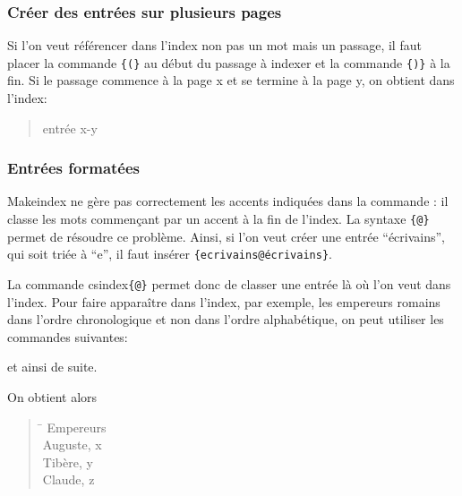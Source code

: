 \begin{bashcode}
  

\subsubsection{Créer des entrées sur plusieurs pages}

Si l'on veut référencer dans l'index non pas un mot mais un passage, il faut placer la commande \verb|{|\verb|(}| au début du passage à indexer et la commande  \verb|{|\verb|)}| à la fin. Si le passage commence à la page x et se termine à la page y, on obtient dans l'index: 

\begin{quotation}
entrée x-y
\end{quotation}


\subsubsection{Entrées formatées}

Makeindex ne gère pas correctement les accents indiquées dans la commande  : il classe les mots commençant par un accent à la fin de l'index. La syntaxe \verb|{|\verb|@|\verb+}+ permet de résoudre ce problème. Ainsi, si l'on veut créer une entrée \enquote{écrivains}, qui soit triée à \enquote{e}, il faut insérer \verb|{ecrivains@écrivains}|.

La commande cs{index}\verb|{|\verb|@|\verb+}+ permet donc de classer une entrée là où l'on veut dans l'index. Pour faire apparaître dans l'index, par exemple, les empereurs romains dans l'ordre chronologique et non dans l'ordre alphabétique, on peut utiliser les commandes suivantes:

\begin{latexcode}
et ainsi de suite. 
\end{latexcode}

On obtient alors
\begin{quotation}
\begin{tabbing}
\hspace{0,5cm} \= \kill
Empereurs\\
\> Auguste, x\\
\> Tibère, y\\
\> Claude, z \\


\end{tabbing}
\end{quotation}
\end{bashcode}

